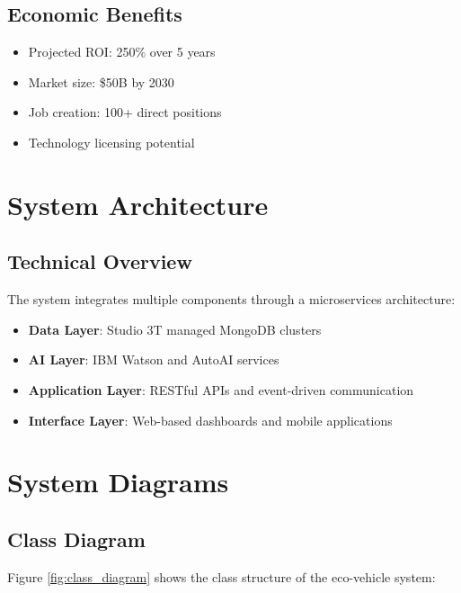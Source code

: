 \documentclass[12pt,a4paper]{article}
\begin{document}
\subsection{Economic Benefits}
\begin{itemize}
    \item Projected ROI: 250\% over 5 years
    \item Market size: \$50B by 2030
    \item Job creation: 100+ direct positions
    \item Technology licensing potential
\end{itemize}

\section{System Architecture}
\subsection{Technical Overview}
The system integrates multiple components through a microservices architecture:
\begin{itemize}
    \item \textbf{Data Layer}: Studio 3T managed MongoDB clusters
    \item \textbf{AI Layer}: IBM Watson and AutoAI services
    \item \textbf{Application Layer}: RESTful APIs and event-driven communication
    \item \textbf{Interface Layer}: Web-based dashboards and mobile applications
\end{itemize}

\section{System Diagrams}
\subsection{Class Diagram}
Figure \ref{fig:class_diagram} shows the class structure of the eco-vehicle system:
\end{document}
